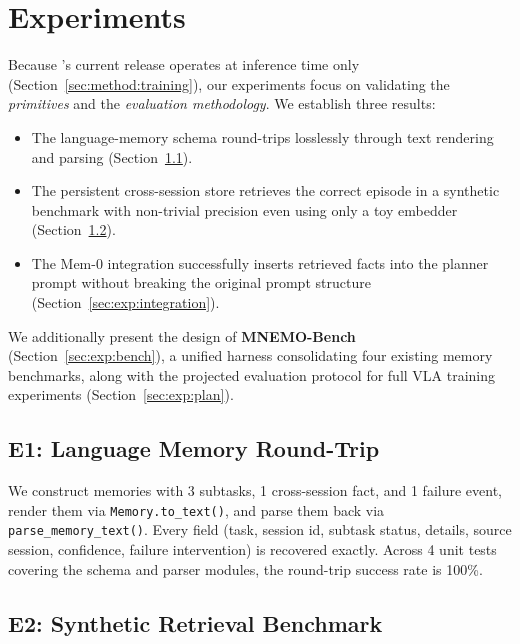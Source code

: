 \section{Experiments}
\label{sec:experiments}

Because \method's current release operates at inference time only
(Section~\ref{sec:method:training}), our experiments focus on
validating the \emph{primitives} and the \emph{evaluation
methodology}. We establish three results:

\begin{itemize}
\item[\textbf{E1}] The language-memory schema round-trips losslessly
      through text rendering and parsing
      (Section~\ref{sec:exp:roundtrip}).
\item[\textbf{E2}] The persistent cross-session store retrieves the
      correct episode in a synthetic benchmark with non-trivial
      precision even using only a toy embedder
      (Section~\ref{sec:exp:retrieval}).
\item[\textbf{E3}] The Mem-0 integration successfully inserts
      retrieved facts into the planner prompt without breaking the
      original prompt structure
      (Section~\ref{sec:exp:integration}).
\end{itemize}

We additionally present the design of \textbf{MNEMO-Bench}
(Section~\ref{sec:exp:bench}), a unified harness consolidating four
existing memory benchmarks, along with the projected evaluation
protocol for full VLA training experiments
(Section~\ref{sec:exp:plan}).

\subsection{E1: Language Memory Round-Trip}
\label{sec:exp:roundtrip}

We construct memories with 3 subtasks, 1 cross-session fact, and
1 failure event, render them via \texttt{Memory.to\_text()}, and
parse them back via \texttt{parse\_memory\_text()}. Every field
(task, session id, subtask status, details, source session,
confidence, failure intervention) is recovered exactly. Across 4
unit tests covering the schema and parser modules, the round-trip
success rate is 100\%.

\subsection{E2: Synthetic Retrieval Benchmark}
\label{sec:exp:retrieval}

